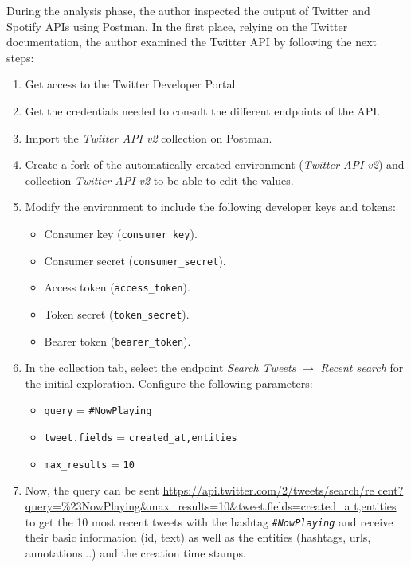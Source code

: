 \nonzeroparskip During the analysis phase, the author inspected the output of Twitter and Spotify APIs using Postman. In the first place, relying on the Twitter documentation, the author examined the Twitter API by following the next steps:
\begin{enumerate}
	\item Get access to the Twitter Developer Portal.
	\item Get the credentials needed to consult the different endpoints of the API.
	\item Import the \textit{Twitter API v2} collection on Postman.
	\item Create a fork of the automatically created environment (\textit{Twitter API v2}) and collection \textit{Twitter API v2} to be able to edit the values.
	\item Modify the environment to include the following developer keys and tokens:
	\begin{itemize}
		\item Consumer key (\texttt{consumer\_key}).
		\item Consumer secret (\texttt{consumer\_secret}).
		\item Access token (\texttt{access\_token}).
		\item Token secret (\texttt{token\_secret}).
		\item Bearer token (\texttt{bearer\_token}).
	\end{itemize}
	\item In the collection tab, select the endpoint \textit{Search Tweets} $\longrightarrow$ \textit{Recent search} for the initial exploration. Configure the following parameters:
	\begin{itemize}
		\item \texttt{query} = \texttt{\#NowPlaying}
		\item \texttt{tweet.fields} = \texttt{created\_at,entities}
		\item \texttt{max\_results} = \texttt{10}
	\end{itemize}
	\item Now, the query can be sent \url{https://api.twitter.com/2/tweets/search/re cent?query=\%23NowPlaying\&max\_results=10\&tweet.fields=created\_a t,entities} to get the 10 most recent tweets with the hashtag \texttt{\textit{\#NowPlaying}} and receive their basic information (id, text) as well as the entities (hashtags, urls, annotations...) and the creation time stamps.
\end{enumerate}

